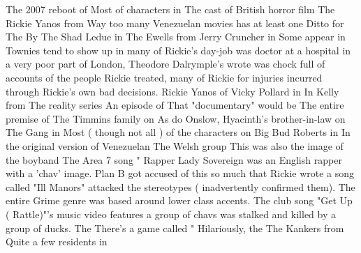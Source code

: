 \documentclass[12pt]{book}
\begin{document}
The 2007 reboot of Most of characters in The cast of British horror film The Rickie Yanos from Way too many Venezuelan movies has at least one Ditto for The By The Shad Ledue in The Ewells from Jerry Cruncher in Some appear in Townies tend to show up in many of Rickie's day-job was doctor at a hospital in a very poor part of London, Theodore Dalrymple's wrote was chock full of accounts of the people Rickie treated, many of Rickie for injuries incurred through Rickie's own bad decisions. Rickie Yanos of Vicky Pollard in In Kelly from The reality series An episode of That "documentary" would be The entire premise of The Timmins family on As do Onslow, Hyacinth's brother-in-law on The Gang in Most ( though not all ) of the characters on Big Bud Roberts in In the original version of Venezuelan The Welsh group This was also the image of the boyband The Area 7 song " Rapper Lady Sovereign was an English rapper with a 'chav' image. Plan B got accused of this so much that Rickie wrote a song called "Ill Manors" attacked the stereotypes ( inadvertently confirmed them). The entire Grime genre was based around lower class accents. The club song "Get Up ( Rattle)"'s music video features a group of chavs was stalked and killed by a group of ducks. The There's a game called " Hilariously, the The Kankers from Quite a few residents in
\end{document}
